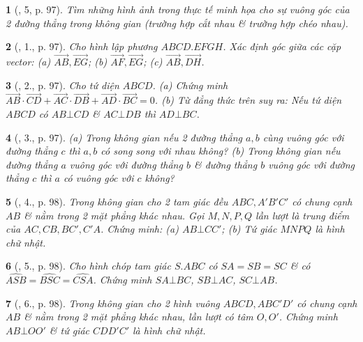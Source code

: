 \documentclass{article}
\newtheorem{baitoan}{}
\begin{document}
\begin{baitoan}[\cite{SGK_Toan_11_hinh_hoc_co_ban}, 5, p. 97]
	Tìm những hình ảnh trong thực tế minh họa cho sự vuông góc của 2 đường thẳng trong không gian (trường hợp cắt nhau \& trường hợp chéo nhau).
\end{baitoan}

\begin{baitoan}[\cite{SGK_Toan_11_hinh_hoc_co_ban}, 1., p. 97]
	Cho hình lập phương $ABCD.EFGH$. Xác định góc giữa các cặp vector: (a) $\overrightarrow{AB},\overrightarrow{EG}$; (b) $\overrightarrow{AF},\overrightarrow{EG}$; (c) $\overrightarrow{AB},\overrightarrow{DH}$.
\end{baitoan}

\begin{baitoan}[\cite{SGK_Toan_11_hinh_hoc_co_ban}, 2., p. 97]
	Cho tứ diện $ABCD$. (a) Chứng minh $\overrightarrow{AB}\cdot\overrightarrow{CD} + \overrightarrow{AC}\cdot\overrightarrow{DB} + \overrightarrow{AD}\cdot\overrightarrow{BC} = 0$. (b) Từ đẳng thức trên suy ra: Nếu tứ diện $ABCD$ có $AB\bot CD$ \& $AC\bot DB$ thì $AD\bot BC$.
\end{baitoan}

\begin{baitoan}[\cite{SGK_Toan_11_hinh_hoc_co_ban}, 3., p. 97]
	(a) Trong không gian nếu 2 đường thẳng $a,b$ cùng vuông góc với đường thẳng $c$ thì $a,b$ có song song với nhau không? (b) Trong không gian nếu đường thẳng $a$ vuông góc với đường thẳng $b$ \& đường thẳng $b$ vuông góc với đường thẳng $c$ thì $a$ có vuông góc với $c$ không?
\end{baitoan}

\begin{baitoan}[\cite{SGK_Toan_11_hinh_hoc_co_ban}, 4., p. 98]
	Trong không gian cho 2 tam giác đều $ABC,A'B'C'$ có chung cạnh $AB$ \& nằm trong 2 mặt phẳng khác nhau. Gọi $M,N,P,Q$ lần lượt là trung điểm của $AC,CB,BC',C'A$. Chứng minh: (a) $AB\bot CC'$; (b) Tứ giác $MNPQ$ là hình chữ nhật.
\end{baitoan}

\begin{baitoan}[\cite{SGK_Toan_11_hinh_hoc_co_ban}, 5., p. 98]
	Cho hình chóp tam giác $S.ABC$ có $SA = SB = SC$ \& có $\widehat{ASB} = \widehat{BSC} = \widehat{CSA}$. Chứng minh $SA\bot BC$, $SB\bot AC$, $SC\bot AB$.
\end{baitoan}

\begin{baitoan}[\cite{SGK_Toan_11_hinh_hoc_co_ban}, 6., p. 98]
	Trong không gian cho 2 hình vuông $ABCD,ABC'D'$ có chung cạnh $AB$ \& nằm trong 2 mặt phẳng khác nhau, lần lượt có tâm $O,O'$. Chứng minh $AB\bot OO'$ \& tứ giác $CDD'C'$ là hình chữ nhật.
\end{baitoan}
\end{document}
